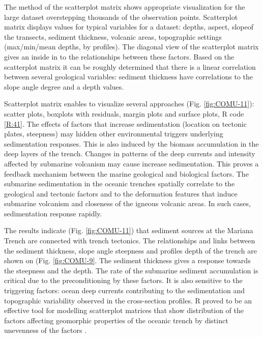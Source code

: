 \documentclass[11pt,a4paper]{report}
\begin{document}
{The method of the scatterplot matrix shows appropriate visualization for the large dataset overstepping thousands of the observation points. Scatterplot matrix displays values for typical variables for a dataset: depths, aspect, slope\degree\space of the transects, sediment thickness, volcanic areas, topographic settings (max/min/mean depths, by profiles). The diagonal view of the scatterplot matrix gives an inside in to the relationships between these factors. Based on the scatterplot matrix it can be roughly determined that there is a linear correlation between several geological variables: sediment thickness have correlations to the slope angle degree and a depth values. 

Scatterplot matrix enables to visualize several approaches (Fig. \ref{fig:COMU-11}): scatter plots, boxplots with residuals, margin plots and surface plots, R code \ref{R:41}. The effects of factors that increase sedimentation (location on tectonic plates, steepness) may hidden other environmental triggers underlying sedimentation responses. This is also induced by the biomass accumulation in the deep layers of the trench. Changes in patterns of the deep currents and intensity affected by submarine volcanism may cause increase sedimentation. This proves a feedback mechanism between the marine geological and biological factors. The submarine sedimentation in the oceanic trenches spatially correlate to the geological and tectonic factors and to the deformation features that induce submarine volcanism and closeness of the igneous volcanic areas. In such cases, sedimentation response rapidly. 

The results indicate (Fig. \ref{fig:COMU-11}) that sediment sources at the Mariana Trench are connected with trench tectonics. The relationships and links between the sediment thickness, slope angle steepness and profiles depth of the trench are shown on (Fig. \ref{fig:COMU-9}. The sediment thickness gives a response towards the steepness and the depth. The rate of the submarine sediment accumulation is critical due to the preconditioning by these factors. It is also sensitive to the triggering factors: ocean deep currents contributing to the sedimentation and topographic variability observed in the cross-section profiles. R proved to be an effective tool for modelling scatterplot matrices that show distribution of the factors affecting geomorphic properties of the oceanic trench by distinct unevenness of the factors \cite{RCoreTeam2014}. 

}
\end{document}
